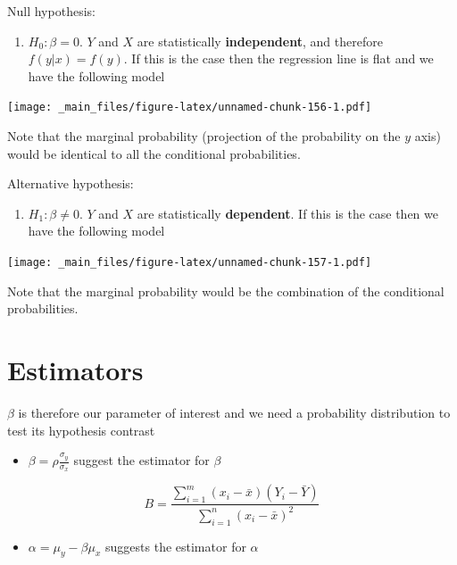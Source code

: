 \documentclass[
]{book}
\providecommand{\tightlist}{%
  \setlength{\itemsep}{0pt}\setlength{\parskip}{0pt}}
\begin{document}
Null hypothesis:

\begin{enumerate}
\def\labelenumi{\alph{enumi}.}
\tightlist
\item
  \(H_0: \beta=0\). \(Y\) and \(X\) are statistically \textbf{independent}, and therefore \(f(y|x)=f(y)\). If this is the case then the regression line is flat and we have the following model
\end{enumerate}

\texttt{[image: \_main\_files/figure-latex/unnamed-chunk-156-1.pdf]}

Note that the marginal probability (projection of the probability on the \(y\) axis) would be identical to all the conditional probabilities.

Alternative hypothesis:

\begin{enumerate}
\def\labelenumi{\alph{enumi}.}
\setcounter{enumi}{1}
\tightlist
\item
  \(H_1: \beta\neq 0\). \(Y\) and \(X\) are statistically \textbf{dependent}. If this is the case then we have the following model
\end{enumerate}

\texttt{[image: \_main\_files/figure-latex/unnamed-chunk-157-1.pdf]}

Note that the marginal probability would be the combination of the conditional probabilities.

\hypertarget{estimators-1}{%
\section{Estimators}\label{estimators-1}}

\(\beta\) is therefore our parameter of interest and we need a probability distribution to test its hypothesis contrast

\begin{itemize}
\tightlist
\item
  \(\beta=\rho\frac{\sigma_y}{\sigma_x}\) suggest the estimator for \(\beta\)
\end{itemize}

\[B=\frac{\sum_{i=1}^m(x_i-\bar{x})(Y_i-\bar{Y})}{\sum_{i=1}^n(x_i-\bar{x})^2}\]

\begin{itemize}
\tightlist
\item
  \(\alpha=\mu_y-\beta\mu_x\) suggests the estimator for \(\alpha\)
\end{itemize}
\end{document}
